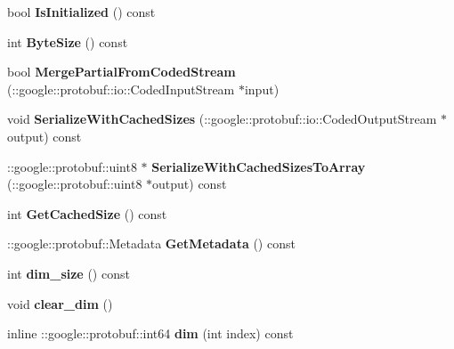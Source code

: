 \begin{DoxyCompactItemize}
bool {\bfseries Is\+Initialized} () const
\item 
\mbox{\label{classcaffe_1_1_blob_shape_a775d5dd961cc5ea98c7ea13c117d773b}} 
int {\bfseries Byte\+Size} () const
\item 
\mbox{\label{classcaffe_1_1_blob_shape_a8ee8fc37cfa38572ea02be406a036208}} 
bool {\bfseries Merge\+Partial\+From\+Coded\+Stream} (\+::google\+::protobuf\+::io\+::\+Coded\+Input\+Stream $\ast$input)
\item 
\mbox{\label{classcaffe_1_1_blob_shape_aca128fc7b7e13e181f145ec1b56c6165}} 
void {\bfseries Serialize\+With\+Cached\+Sizes} (\+::google\+::protobuf\+::io\+::\+Coded\+Output\+Stream $\ast$output) const
\item 
\mbox{\label{classcaffe_1_1_blob_shape_a0f2615c947886013ad5d6dc27866285a}} 
\+::google\+::protobuf\+::uint8 $\ast$ {\bfseries Serialize\+With\+Cached\+Sizes\+To\+Array} (\+::google\+::protobuf\+::uint8 $\ast$output) const
\item 
\mbox{\label{classcaffe_1_1_blob_shape_ad9f41fbb4f768211fd1f06491161ef2c}} 
int {\bfseries Get\+Cached\+Size} () const
\item 
\mbox{\label{classcaffe_1_1_blob_shape_af913a2f9e18b69811021121fda437a8f}} 
\+::google\+::protobuf\+::\+Metadata {\bfseries Get\+Metadata} () const
\item 
\mbox{\label{classcaffe_1_1_blob_shape_a9268d68cbd5fe7224e1f88d110254097}} 
int {\bfseries dim\+\_\+size} () const
\item 
\mbox{\label{classcaffe_1_1_blob_shape_a2e42c7e89e6757a77fc2fb7c640ba3db}} 
void {\bfseries clear\+\_\+dim} ()
\item 
\mbox{\label{classcaffe_1_1_blob_shape_adbf79366b89153a55b4a0187cb5cbfc4}} 
inline \+::google\+::protobuf\+::int64 {\bfseries dim} (int index) const
\item 
\mbox{\label{classcaffe_1_1_blob_shape_ac2607945d73b985c1d1d667d75e3f220}} 

\end{DoxyCompactItemize}
